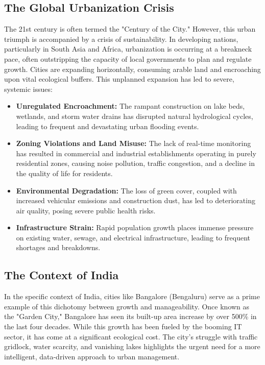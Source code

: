 \documentclass[12pt,a4paper]{report}
\begin{document}
\subsection{The Global Urbanization Crisis}
The 21st century is often termed the "Century of the City." However, this urban triumph is accompanied by a crisis of sustainability. In developing nations, particularly in South Asia and Africa, urbanization is occurring at a breakneck pace, often outstripping the capacity of local governments to plan and regulate growth. Cities are expanding horizontally, consuming arable land and encroaching upon vital ecological buffers. This unplanned expansion has led to severe, systemic issues:
\begin{itemize}
    \item \textbf{Unregulated Encroachment:} The rampant construction on lake beds, wetlands, and storm water drains has disrupted natural hydrological cycles, leading to frequent and devastating urban flooding events.
    \item \textbf{Zoning Violations and Land Misuse:} The lack of real-time monitoring has resulted in commercial and industrial establishments operating in purely residential zones, causing noise pollution, traffic congestion, and a decline in the quality of life for residents.
    \item \textbf{Environmental Degradation:} The loss of green cover, coupled with increased vehicular emissions and construction dust, has led to deteriorating air quality, posing severe public health risks.
    \item \textbf{Infrastructure Strain:} Rapid population growth places immense pressure on existing water, sewage, and electrical infrastructure, leading to frequent shortages and breakdowns.
\end{itemize}

\subsection{The Context of India}
In the specific context of India, cities like Bangalore (Bengaluru) serve as a prime example of this dichotomy between growth and manageability. Once known as the "Garden City," Bangalore has seen its built-up area increase by over 500\% in the last four decades. While this growth has been fueled by the booming IT sector, it has come at a significant ecological cost. The city's struggle with traffic gridlock, water scarcity, and vanishing lakes highlights the urgent need for a more intelligent, data-driven approach to urban management.
\end{document}
